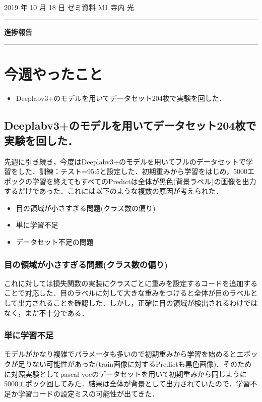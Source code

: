\documentclass[onecolumn]{ujarticle}   %
\begin{document}
	
	\noindent
	
	\hspace{1em}
	2019 年 10 月 18 日
	ゼミ資料
	\hfill
	M1 寺内 光
	
	\vspace{2mm}
	
	\hrule
	
	\begin{center}
		{\Large \bf 進捗報告}
	\end{center}
	
	
	\hrule
	\vspace{3mm}
	
	\section{今週やったこと}
	\begin{itemize}
		\item Deeplabv3+のモデルを用いてデータセット204枚で実験を回した．
	\end{itemize}

	\subsection{Deeplabv3+のモデルを用いてデータセット204枚で実験を回した．}
	先週に引き続き，今度はDeeplabv3+のモデルを用いてフルのデータセットで学習をした．訓練：テスト=95:5と設定した．初期重みから学習をはじめ，5000エポックの学習を終えてもすべてのPredictは全体が黒色(背景ラベル)の画像を出力するだけであった．これには以下のような複数の原因が考えられた．
	
	\begin{itemize}
		\item 目の領域が小さすぎる問題(クラス数の偏り)
		\item 単に学習不足
		\item データセット不足の問題
	\end{itemize}

	\subsubsection{目の領域が小さすぎる問題(クラス数の偏り)}
	これに対しては損失関数の実装にクラスごとに重みを設定するコードを追加することで対応した．目のラベルに対して大きな重みをつけると全体が目のラベルとして出力されることを確認した．しかし，正確に目の領域が検出されるわけではなく，まだ不十分である．

	\subsubsection{単に学習不足}
	モデルがかなり複雑でパラメータも多いので初期重みから学習を始めるとエポックが足りない可能性があった(train画像に対するPredictも黒色画像)．そのために対照実験としてpascal vocのデータセットを用いて初期重みから同じように5000エポック回してみた．結果は全体が背景として出力されていたので．学習不足か学習コードの設定ミスの可能性が出てきた．
	
\end{document}
